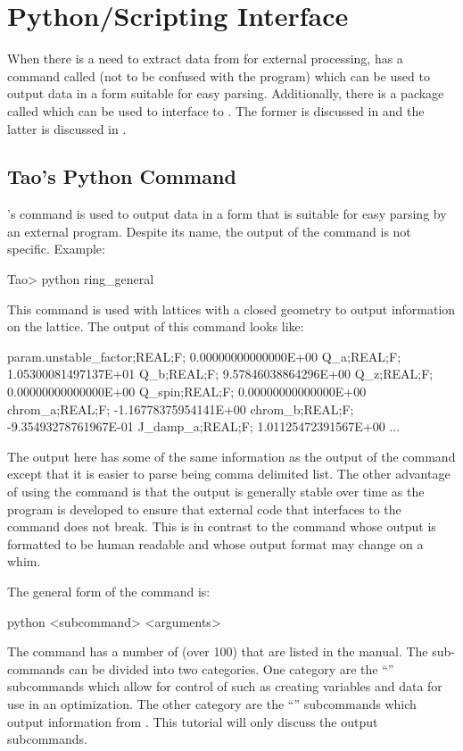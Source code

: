 \documentclass{hitec}     %
\newcommand{\Section}[1]{\section{#1}\vspace*{-1ex}}
\begin{document}
{\newpage

\Section{Python/Scripting Interface}
\label{s:python}

When there is a need to extract data from \tao for external processing, \tao has a command called
 (not to be confused with the  program) which can be used to output data in a
form suitable for easy parsing. Additionally, there is a package called  which can be used
to interface \tao to . The former is discussed in  and the latter is
discussed in .

\subsection{Tao's Python Command}
\label{s:python.cmd}

\tao's  command is used to output data in a form that is suitable for easy parsing by an
external program. Despite its name, the output of the  command is not  specific.
Example:
\begin{code}
Tao> python ring_general
\end{code}
This command is used with lattices with a closed geometry to output information on the lattice.
The output of this command looks like:
\begin{code}
param.unstable_factor;REAL;F;  0.00000000000000E+00
Q_a;REAL;F;  1.05300081497137E+01
Q_b;REAL;F;  9.57846038864296E+00
Q_z;REAL;F;  0.00000000000000E+00
Q_spin;REAL;F;  0.00000000000000E+00
chrom_a;REAL;F; -1.16778375954141E+00
chrom_b;REAL;F; -9.35493278761967E-01
J_damp_a;REAL;F;  1.01125472391567E+00
...
\end{code}
The output here has some of the same information as the output of the  command
except that it is easier to parse being comma delimited list. The other advantage of using the
 command is that the output is generally stable over time as the \tao program is
developed to ensure that external code that interfaces to the  command does not break.
This is in contrast to the  command whose output is formatted to be human readable and whose
output format may change on a whim.

The general form of the  command is:
\begin{code}
  python <subcommand> <arguments>
\end{code}
The  command has a number of  (over 100) that are listed in the \tao
manual. The sub-commands can be divided into two categories. One category are the ``''
subcommands which allow for control of \tao such as creating variables and data for use in an
optimization. The other category are the ``'' subcommands which output information from
\tao. This tutorial will only discuss the output subcommands.

}
\end{document}
